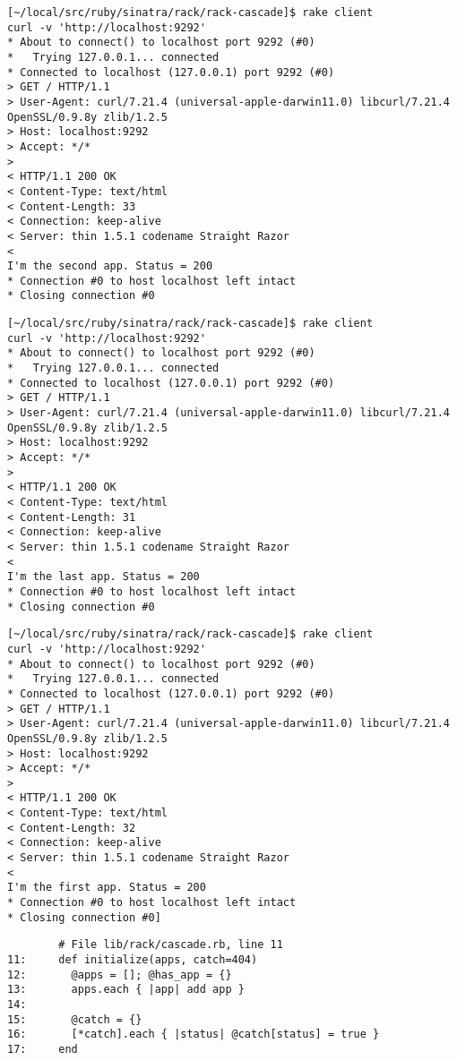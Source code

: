 \begin{verbatim}
[~/local/src/ruby/sinatra/rack/rack-cascade]$ rake client
curl -v 'http://localhost:9292'
* About to connect() to localhost port 9292 (#0)
*   Trying 127.0.0.1... connected
* Connected to localhost (127.0.0.1) port 9292 (#0)
> GET / HTTP/1.1
> User-Agent: curl/7.21.4 (universal-apple-darwin11.0) libcurl/7.21.4 OpenSSL/0.9.8y zlib/1.2.5
> Host: localhost:9292
> Accept: */*
> 
< HTTP/1.1 200 OK
< Content-Type: text/html
< Content-Length: 33
< Connection: keep-alive
< Server: thin 1.5.1 codename Straight Razor
< 
I'm the second app. Status = 200
* Connection #0 to host localhost left intact
* Closing connection #0
\end{verbatim}

\begin{verbatim}
[~/local/src/ruby/sinatra/rack/rack-cascade]$ rake client
curl -v 'http://localhost:9292'
* About to connect() to localhost port 9292 (#0)
*   Trying 127.0.0.1... connected
* Connected to localhost (127.0.0.1) port 9292 (#0)
> GET / HTTP/1.1
> User-Agent: curl/7.21.4 (universal-apple-darwin11.0) libcurl/7.21.4 OpenSSL/0.9.8y zlib/1.2.5
> Host: localhost:9292
> Accept: */*
> 
< HTTP/1.1 200 OK
< Content-Type: text/html
< Content-Length: 31
< Connection: keep-alive
< Server: thin 1.5.1 codename Straight Razor
< 
I'm the last app. Status = 200
* Connection #0 to host localhost left intact
* Closing connection #0
\end{verbatim}

\begin{verbatim}
[~/local/src/ruby/sinatra/rack/rack-cascade]$ rake client
curl -v 'http://localhost:9292'
* About to connect() to localhost port 9292 (#0)
*   Trying 127.0.0.1... connected
* Connected to localhost (127.0.0.1) port 9292 (#0)
> GET / HTTP/1.1
> User-Agent: curl/7.21.4 (universal-apple-darwin11.0) libcurl/7.21.4 OpenSSL/0.9.8y zlib/1.2.5
> Host: localhost:9292
> Accept: */*
> 
< HTTP/1.1 200 OK
< Content-Type: text/html
< Content-Length: 32
< Connection: keep-alive
< Server: thin 1.5.1 codename Straight Razor
< 
I'm the first app. Status = 200
* Connection #0 to host localhost left intact
* Closing connection #0]
\end{verbatim}


\begin{verbatim}
        # File lib/rack/cascade.rb, line 11
11:     def initialize(apps, catch=404)
12:       @apps = []; @has_app = {}
13:       apps.each { |app| add app }
14: 
15:       @catch = {}
16:       [*catch].each { |status| @catch[status] = true }
17:     end
\end{verbatim}

